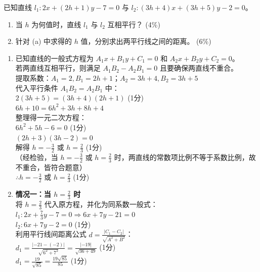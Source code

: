 \documentclass[12pt,a4paper]{exam-zh}
\begin{document}
\begin{problem}[points = 10]
    已知直线 $l_1: 2x + (2h + 1)y - 7 = 0$ 与 $l_2: (3h + 4)x + (3h + 5)y - 2 = 0$。
    \begin{enumerate}[label=(\alph*)]
        \item 当 $h$ 为何值时，直线 $l_1$ 与 $l_2$ 互相平行？ \hfill (4\%)
        \item 针对 (a) 中求得的 $h$ 值，分别求出两平行线之间的距离。 \hfill (6\%)
    \end{enumerate}
\end{problem}

\begin{solution}
    \begin{enumerate}[label=(\alph*)]
        \item 已知直线的一般式方程为 $A_1x + B_1y + C_1 = 0$ 和 $A_2x + B_2y + C_2 = 0$。\\
        若两直线互相平行，则满足 $A_1B_2 - A_2B_1 = 0$ 且要确保两直线不重合。 \\
        提取系数：$A_1 = 2, B_1 = 2h + 1$；$A_2 = 3h + 4, B_2 = 3h + 5$ \\
        代入平行条件 $A_1B_2 = A_2B_1$ 中： \\
        $2(3h + 5) = (3h + 4)(2h + 1)$ \hfill (1分) \\
        $6h + 10 = 6h^2 + 3h + 8h + 4$ \\
        整理得一元二次方程： \\
        $6h^2 + 5h - 6 = 0$ \hfill (1分) \\
        $(2h + 3)(3h - 2) = 0$ \\
        解得 $h = -\frac{3}{2}$ 或 $h = \frac{2}{3}$ \hfill (1分) \\
        （经检验，当 $h = -\frac{3}{2}$ 或 $h = \frac{2}{3}$ 时，两直线的常数项比例不等于系数比例，故不重合，皆符合题意） \\
        $\therefore h = -\frac{3}{2}$ 或 $h = \frac{2}{3}$ \hfill (1分)

        \item 
        \textbf{情况一：当 $h = \frac{2}{3}$ 时} \\
        将 $h = \frac{2}{3}$ 代入原方程，并化为同系数一般式：\\
        $l_1: 2x + \frac{7}{3}y - 7 = 0 \Rightarrow 6x + 7y - 21 = 0$ \\
        $l_2: 6x + 7y - 2 = 0$ \hfill (1分) \\
        利用平行线间距离公式 $d = \frac{|C_1 - C_2|}{\sqrt{A^2 + B^2}}$：\\
        $d_1 = \frac{|-21 - (-2)|}{\sqrt{6^2 + 7^2}} = \frac{|-19|}{\sqrt{36 + 49}}$ \hfill (1分) \\
        $d_1 = \frac{19}{\sqrt{85}} = \frac{19\sqrt{85}}{85}$ \hfill (1分)


\end{enumerate}
\end{solution}
\end{document}
